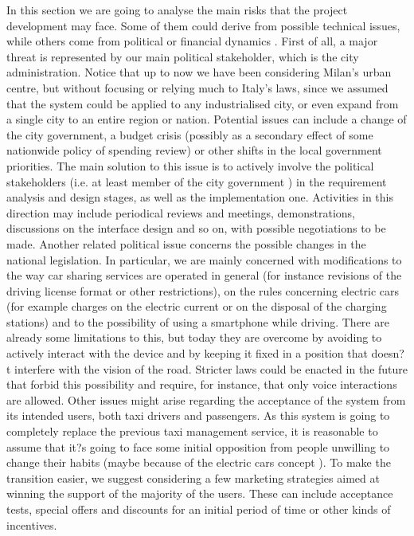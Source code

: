 \documentclass{article}
\begin{document}
\begin{flushleft}
In this section we are going to analyse the main risks that the project development may face. Some of them could derive from possible technical issues, while others come from political or financial dynamics .
First of all, a major threat is represented by our main political stakeholder, which is the city administration. Notice that up to now we have been  considering Milan's urban centre, but without focusing or relying much to Italy's laws, since we assumed that the system could be applied to any industrialised city, or even expand from a single city to an entire region or nation. Potential issues can include a change of the city government, a budget crisis (possibly as a secondary effect of some nationwide policy of spending review) or other shifts in the local government priorities. The main solution to this issue is to actively  involve the political stakeholders (i.e. at least  member of the city government ) in the requirement analysis and design stages, as well as the implementation one. Activities in this direction may include periodical reviews and meetings, demonstrations, discussions on the interface design and so on, with possible negotiations to be made.
Another related political issue concerns the possible changes in the national legislation. In particular, we are mainly concerned with modifications to the way car sharing  services are operated in general (for instance revisions of the driving license format or other restrictions), on the rules concerning electric cars (for example charges on the electric current or on the disposal of the charging stations) and to the possibility of using a smartphone while driving. There are already some limitations to this, but today they are overcome by avoiding to actively interact with the device and by keeping it fixed in a position that doesn?t interfere with the vision of the road. Stricter laws could be enacted in the future that forbid this possibility and require, for instance, that only voice interactions are allowed.   
Other issues might arise regarding the acceptance of the system from its intended users, both taxi drivers and passengers. As this system is going to completely replace the previous taxi management service, it is reasonable to assume that it?s going to face some initial opposition from people unwilling to change their habits (maybe because of the electric cars concept ). To make the transition easier, we suggest considering a few marketing strategies aimed at winning the support of the majority of the users. These can include acceptance tests, special offers and discounts for an initial period of time or other kinds of incentives.

\end{flushleft}
\end{document}
